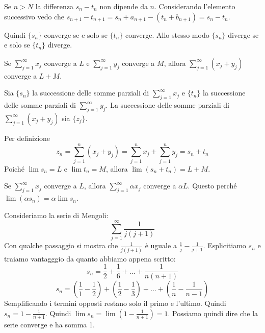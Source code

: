 Se $n > N$ la differenza $s_n - t_n$ non dipende da $n$. Considerando l'elemento successivo vedo che $s_{n+1} - t_{n+1} = s_n + a_{n+1} - (t_n + b_{n+1}) = s_n - t_n$.

Quindi $\{s_n\}$ converge se e solo se $\{t_n\}$ converge. Allo stesso modo $\{s_n\}$ diverge se e solo se $\{t_n\}$ diverge.

\begin{remark}
Se $\sum_{j=1}^\infty x_j$ converge a $L$ e $\sum_{j=1}^\infty y_j$ converge a $M$, allora $\sum_{j=1}^\infty (x_j + y_j)$ converge a $L+M$.
\end{remark}

Sia $\{s_n\}$ la successione delle somme parziali di $\sum_{j=1}^\infty x_j$ e $\{t_n\}$ la successione delle somme parziali di $\sum_{j=1}^\infty y_j$. La successione delle somme parziali di $\sum_{j=1}^\infty (x_j + y_j)$ sia $\{z_j\}$.

Per definizione
\begin{equation*}
z_n = \sum_{j=1}^n (x_j+y_j) = \sum_{j=1}^n x_j + \sum_{j=1}^n y_j = s_n + t_n
\end{equation*}
Poiché $\lim s_n = L$ e $\lim t_n = M$, allora $\lim (s_n+t_n) = L + M$.

\begin{remark}
Se $\sum_{j=1}^\infty x_j$ converge a $L$, allora $\sum_{j=1}^\infty \alpha x_j$ converge a $\alpha L$. Questo perché $\lim (\alpha s_n) = \alpha \lim s_n$.
\end{remark}

\begin{example}
Consideriamo la serie di Mengoli:
\begin{equation*}
\sum_{j=1}^\infty \frac{1}{j(j+1)}
\end{equation*}
Con qualche passaggio si mostra che $\frac{1}{j(j+1)}$ è uguale a $\frac{1}{j} - \frac{1}{j+1}$. Esplicitiamo $s_n$ e traiamo vantagggio da quanto abbiamo appena scritto:
\begin{equation*}
s_n = \frac{1}{2} + \frac{1}{6} + \ldots + \frac{1}{n(n+1)}
\end{equation*}
\begin{equation*}
s_n = \left(\frac{1}{1} - \frac{1}{2}\right) + \left(\frac{1}{2}-\frac{1}{3}\right) + \ldots + \left(\frac{1}{n} - \frac{1}{n-1} \right)
\end{equation*}
Semplificando i termini opposti restano solo il primo e l'ultimo. Quindi $s_n = 1 - \frac{1}{n+1}$. Quindi $\lim s_n = \lim (1-\frac{1}{n+1}) = 1$. Possiamo quindi dire che la serie converge e ha somma 1.

\end{example}

